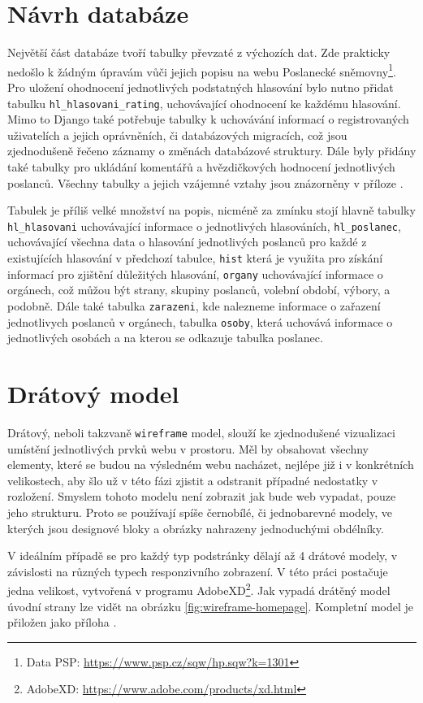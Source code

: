 \section{Návrh databáze}
Největší část databáze tvoří tabulky převzaté z výchozích dat. Zde prakticky nedošlo k žádným úpravám vůči jejich popisu na webu Poslanecké sněmovny\footnote{Data PSP: \url{https://www.psp.cz/sqw/hp.sqw?k=1301}}. Pro uložení ohodnocení jednotlivých podstatných hlasování bylo nutno přidat tabulku \texttt{hl\_hlasovani\_rating}, uchovávající ohodnocení ke každému hlasování. Mimo to Django také potřebuje tabulky k uchovávání informací o registrovaných uživatelích a jejich oprávněních, či databázových migracích, což jsou zjednodušeně řečeno záznamy o změnách databázové struktury. Dále byly přidány také tabulky pro ukládání komentářů a hvězdičkových hodnocení jednotlivých poslanců. Všechny tabulky a jejich vzájemné vztahy jsou znázorněny v příloze .

\par Tabulek je příliš velké množství na popis, nicméně za zmínku stojí hlavně tabulky \texttt{hl\_hlasovani} uchovávající informace o jednotlivých hlasováních, \texttt{hl\_poslanec}, uchovávající všechna data o hlasování jednotlivých poslanců pro každé z existujících hlasování v předchozí tabulce, \texttt{hist} která je využita pro získání informací pro zjištění důležitých hlasování, \texttt{organy} uchovávající informace o orgánech, což můžou být strany, skupiny poslanců, volební období, výbory, a podobně. Dále také tabulka \texttt{zarazeni}, kde nalezneme  informace o zařazení jednotlivych poslanců v orgánech, tabulka \texttt{osoby}, která uchovává informace o jednotlivých osobách a na kterou se odkazuje tabulka poslanec.

\section{Drátový model}
\label{section:wireframe}
Drátový, neboli takzvaně \texttt{wireframe} model, slouží ke zjednodušené vizualizaci umístění jednotlivých prvků webu v prostoru. Měl by obsahovat všechny elementy, které se budou na výsledném webu nacházet, nejlépe již i v konkrétních velikostech, aby šlo už v této fázi zjistit a odstranit případné nedostatky v rozložení. Smyslem tohoto modelu není zobrazit jak bude web vypadat, pouze jeho strukturu. Proto se používají spíše černobílé, či jednobarevné modely, ve kterých jsou designové bloky a obrázky nahrazeny jednoduchými obdélníky.
\par V ideálním případě se pro každý typ podstránky dělají až 4 drátové modely, v závislosti na různých typech responzivního zobrazení. V této práci postačuje jedna velikost, vytvořená v programu AdobeXD\footnote{AdobeXD: \url{https://www.adobe.com/products/xd.html}}. Jak vypadá drátěný model úvodní strany lze vidět na obrázku \ref{fig:wireframe-homepage}. Kompletní model je přiložen jako příloha . 

